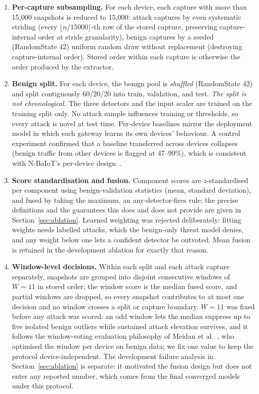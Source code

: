 \documentclass[sigconf,review,anonymous]{acmart}
\begin{document}
\begin{enumerate}
\item \textbf{Per-capture subsampling.} For each device, each capture with more than 15{,}000 snapshots is reduced to 15{,}000: attack captures by even systematic striding (every $\lfloor n/15000 \rfloor$-th row of the stored capture, preserving capture-internal order at stride granularity), benign captures by a seeded (RandomState 42) uniform random draw without replacement (destroying capture-internal order). Stored order within each capture is otherwise the order produced by the extractor.
\item \textbf{Benign split.} For each device, the benign pool is \emph{shuffled} (RandomState 42) and split contiguously 60/20/20 into train, validation, and test. \emph{The split is not chronological.} The three detectors and the input scaler are trained on the training split only. No attack sample influences training or thresholds, so every attack is novel at test time. Per-device baselines mirror the deployment model in which each gateway learns its own devices' behaviour. A control experiment confirmed that a baseline transferred across devices collapses (benign traffic from other devices is flagged at 47--99\%), which is consistent with N-BaIoT's per-device design~\cite{meidan2018nbaiot}.
\item \textbf{Score standardisation and fusion.} Component scores are $z$-standardised per component using benign-validation statistics (mean, standard deviation), and fused by taking the maximum, an any-detector-fires rule; the precise definitions and the guarantees this does and does not provide are given in Section~\ref{sec:ablation}. Learned weighting was rejected deliberately: fitting weights needs labelled attacks, which the benign-only threat model denies, and any weight below one lets a confident detector be outvoted. Mean fusion is retained in the development ablation for exactly that reason.
\item \textbf{Window-level decisions.} Within each split and each attack capture separately, snapshots are grouped into disjoint consecutive windows of $W{=}11$ in stored order; the window score is the median fused score, and partial windows are dropped, so every snapshot contributes to at most one decision and no window crosses a split or capture boundary. $W{=}11$ was fixed before any attack was scored: an odd window lets the median suppress up to five isolated benign outliers while sustained attack elevation survives, and it follows the window-voting evaluation philosophy of Meidan et al.~\cite{meidan2018nbaiot}, who optimised the window per device on benign data; we fix one value to keep the protocol device-independent. The development failure analysis in Section~\ref{sec:ablation} is separate: it motivated the fusion design but does not enter any reported number, which comes from the final converged models under this protocol.

\end{enumerate}
\end{document}
